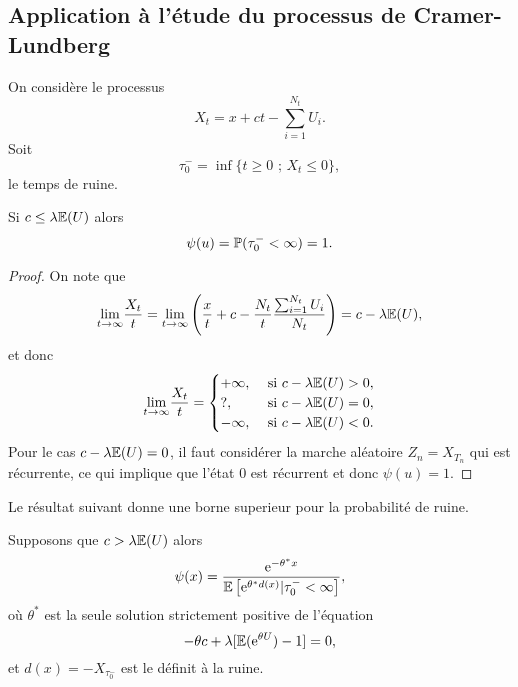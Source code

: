 \subsection{Application à l'étude du processus de Cramer-Lundberg}
On considère le processus 
$$
X_t = x +ct - \sum_{i = 1}^{N_t}U_i.
$$
Soit 
$$
\tau_0^- = \inf\{t\geq 0\text{ ; }X_t\leq 0\},
$$
le temps de ruine. 
\begin{prop}
Si $c\leq \lambda\mathbb{E}(U)$ alors 
$$
\psi(u) = \mathbb{P}(\tau_0^-<\infty)=1.
$$
\end{prop}
\begin{proof}
On note que 
$$
\underset{t\rightarrow \infty}{\lim} \frac{X_t}{t}= \underset{t\rightarrow \infty}{\lim}\left(\frac{x}{t}+c-\frac{N_t}{t}\frac{\sum_{i=1}^{N_t}U_i}{N_t}\right) = c-\lambda \mathbb{E}(U),
$$
et donc 
$$
\underset{ t\rightarrow \infty}{\lim} \frac{X_t}{t} = \begin{cases}
+\infty,&\text{ si }c-\lambda \mathbb{E}(U)>0,\\
?,&\text{ si }c-\lambda \mathbb{E}(U)=0,\\
-\infty,&\text{ si }c-\lambda \mathbb{E}(U)<0.
\end{cases}
$$
Pour le cas $c-\lambda \mathbb{E}(U)=0$, il faut considérer la marche aléatoire $Z_n = X_{T_n}$ qui est récurrente, ce qui implique que l'état $0$ est récurrent et donc $\psi(u) =1$.
\end{proof}
Le résultat suivant donne une borne superieur pour la probabilité de ruine. 
\begin{theo}
Supposons que $c>\lambda\mathbb{E}(U)$ alors 
$$
\psi(x) =  \frac{ \mathrm{e}^{-\theta^\ast x}}{\mathbb{E}\left[\mathrm{e}^{\theta^\ast d(x)}|\tau_0^-<\infty\right]},
$$
où $\theta^\ast$ est la seule solution strictement positive de l'équation 
$$
-\theta c + \lambda [\mathbb{E}(\mathrm{e}^{\theta U})-1] = 0,
$$
et $d(x) = -X_{\tau_0^-}$ est le définit à la ruine. 
\end{theo}
